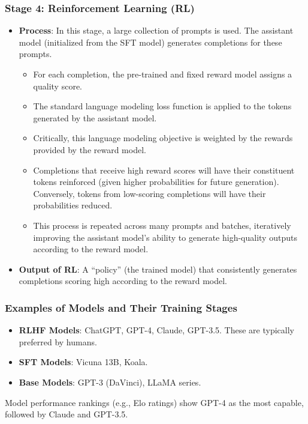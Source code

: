 \subsubsection{Stage 4: Reinforcement Learning (RL)}

\begin{itemize}
    \item \textbf{Process}: In this stage, a large collection of prompts is used. The assistant model (initialized from the SFT model) generates completions for these prompts.
        \begin{itemize}
            \item For each completion, the pre-trained and fixed reward model assigns a quality score.
            \item The standard language modeling loss function is applied to the tokens generated by the assistant model.
            \item Critically, this language modeling objective is weighted by the rewards provided by the reward model.
            \item Completions that receive high reward scores will have their constituent tokens reinforced (given higher probabilities for future generation). Conversely, tokens from low-scoring completions will have their probabilities reduced.
            \item This process is repeated across many prompts and batches, iteratively improving the assistant model's ability to generate high-quality outputs according to the reward model.
        \end{itemize}
    \item \textbf{Output of RL}: A ``policy'' (the trained model) that consistently generates completions scoring high according to the reward model.
\end{itemize}

\subsubsection{Examples of Models and Their Training Stages}

\begin{itemize}
    \item \textbf{RLHF Models}: ChatGPT, GPT-4, Claude, GPT-3.5. These are typically preferred by humans.
    \item \textbf{SFT Models}: Vicuna 13B, Koala.
    \item \textbf{Base Models}: GPT-3 (DaVinci), LLaMA series.
\end{itemize}
Model performance rankings (e.g., Elo ratings) show GPT-4 as the most capable, followed by Claude and GPT-3.5.

